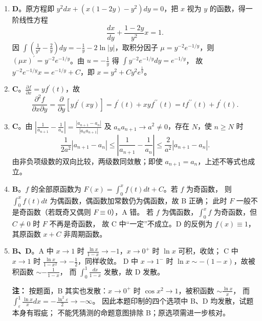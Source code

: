 \begin{enumerate}
{\begin{enumerate}
	\item
	\textbf{D}。原方程即 $y^2 d x+\left(x(1-2 y)-y^2\right) d y=0$，把 $x$ 视为 $y$ 的函数，得一阶线性方程
	\[
	\frac{d x}{d y}+\frac{1-2 y}{y^2} x=1 .
	\]
	因 $\int\left(\frac{1}{y^2}-\frac{2}{y}\right) d y=-\frac{1}{y}-2 \ln |y|$，取积分因子 $\mu=y^{-2} e^{-1 / y}$，则
	$(\mu x)^{\prime}=y^{-2} e^{-1 / y}$。由 $u=-\frac{1}{y}$ 得 $\int y^{-2} e^{-1 / y} d y=e^{-1 / y}$，
	故 $y^{-2} e^{-1 / y} x=e^{-1 / y}+C$，即 $x=y^2+C y^2 e^{\frac{1}{y}}$。

	\item
	\textbf{C}。$\frac{\partial f}{\partial x}=y f^{\prime}(t)$，故
	\[
	\frac{\partial^2 f}{\partial x \partial y}=\frac{\partial}{\partial y}\left[y f^{\prime}(x y)\right]
	=f^{\prime}(t)+x y f^{\prime \prime}(t)=t f^{\prime \prime}(t)+f^{\prime}(t) .
	\]

	\item
	\textbf{C}。由
	$\left|\frac{1}{a_{n+1}}-\frac{1}{a_n}\right|=\frac{\left|a_{n+1}-a_n\right|}{\left|a_n a_{n+1}\right|}$
	及 $a_n a_{n+1}\to a^2\ne0$，存在 $N$，使 $n\ge N$ 时
	\[
	 \frac{1}{2a^2}|a_{n+1}-a_n|
	 \le \left|\frac1{a_{n+1}}-\frac1{a_n}\right|
	 \le \frac{2}{a^2}|a_{n+1}-a_n|.
	\]
	由非负项级数的双向比较，两级数同敛散；即使 $a_{n+1}=a_n$，上述不等式也成立。

	\item
	\textbf{B}。$f$ 的全部原函数为 $F(x)=\int_0^x f(t) d t+C$。若 $f$ 为奇函数，
	则 $\int_0^x f(t) d t$ 为偶函数，偶函数加常数仍为偶函数，故 B 正确；
	此时 $F$ 一般不是奇函数（若既奇又偶则 $F \equiv 0$），A 错。
	若 $f$ 为偶函数，$\int_0^x f$ 为奇函数，但 $C \neq 0$ 时 $F$ 不再是奇函数，
	故 C 中“一定”不成立。D 的反例为 $f(x) \equiv 1$，其原函数 $x+C$ 非周期函数。

	\item
	\textbf{B、D}。A 中 $x \rightarrow 1$ 时 $\frac{\ln x}{1-x} \rightarrow-1$，$x \rightarrow 0^{+}$ 时 $\ln x$ 可积，收敛；
	C 中 $x \rightarrow 1$ 时 $\frac{\ln x}{1-x^2} \rightarrow-\frac{1}{2}$，同样收敛。
	D 中 $x \rightarrow 1^{-}$ 时 $\ln x \sim-(1-x)$，故被积函数 $\sim-\frac{1}{1-x}$，
	而 $\int_0^1 \frac{d x}{1-x}$ 发散，故 D 发散。

	\par\vspace{1mm}\noindent
	\textbf{注：}{\kaishu
	按题面，B 其实也发散：$x \rightarrow 0^{+}$ 时 $\cos x^2 \rightarrow 1$，被积函数 $\sim \frac{\ln x}{x}$，
	而 $\int_\varepsilon^1 \frac{\ln x}{x} d x=-\frac{\ln ^2 \varepsilon}{2} \rightarrow-\infty$。
	因此本题印制的四个选项中 B、D 均发散，试题本身有瑕疵；
	不能凭猜测的命题意图排除 B；原选项需进一步核对。
	}\par
\end{enumerate}
}



\end{enumerate}
